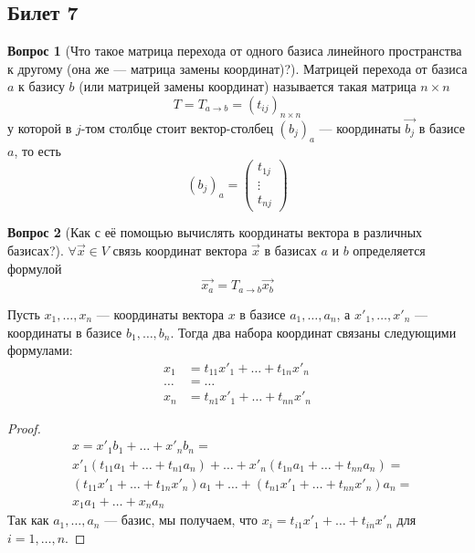\documentclass[a4paper,11pt]{article}
\theoremstyle{remark}
\theoremstyle{definition}
\newtheorem{question}{Вопрос}
\numberwithin{question}{subsection}
\begin{document}
\subsection{Билет 7}
\begin{question}[Что такое матрица перехода от одного базиса линейного пространства к другому (она же --- матрица замены координат)?]
Матрицей перехода от базиса \(a\) к базису \(b\) (или матрицей замены координат) называется такая матрица \(n \times n\)
\begin{equation*}
    T = T_{a \rightarrow b} = (t_{ij})_{n \times n}
\end{equation*}
у которой в \(j\)-том столбце стоит вектор-столбец \((b_j)_a\) --- координаты \(\vec{b_j}\) в базисе \(a\), то есть
\begin{equation*}
    (b_j)_a =
    \begin{pmatrix}
        t_{1j} \\
        \vdots \\
        t_{nj}
    \end{pmatrix} 
\end{equation*}
\end{question}


\begin{question}[Как с её помощью вычислять координаты вектора в различных базисах?]
\(\forall \vec{x} \in V\) связь координат вектора \(\vec{x}\) в базисах \(a\) и \(b\) определяется формулой
\begin{equation*}
     \vec{x_a} = T_{a \rightarrow b}\vec{x_b}
\end{equation*} 

Пусть \(x_1, \dots, x_n\) --- координаты вектора \(x\) в базисе \(a_1, \dots, a_n\), а \(x'_1, \dots, x'_n\) --- координаты в базисе \(b_1, \dots, b_n\). Тогда два набора координат связаны следующими формулами:
\begin{align*}
	x_1 &= t_{11}x'_1 + \dots + t_{1n}x'_n \\
	\dots &= \dots \\
	x_n &= t_{n1}x'_1 + \dots + t_{nn}x'_n
\end{align*}

\begin{proof}
\begin{align*}
	&x = x'_1b_1 + \dots + x'_nb_n = \\ 
	&x'_1(t_{11}a_1 + \dots + t_{n1}a_n) + \dots + x'_n(t_{1n}a_1 + \dots + t_{nn}a_n) = \\ 
	&(t_{11}x'_1 + \dots + t_{1n}x'_n)a_1 + \dots + (t_{n1}x'_1 + \dots + t_{nn}x'_n)a_n = \\
	&x_1a_1 + \dots + x_na_n
\end{align*}
Так как \(a_1, \dots, a_n\) --- базис, мы получаем, что \(x_i = t_{i1}x'_1 + \dots + t_{in}x'_n\) для \(i = 1, \dots, n\).
\end{proof}
\end{question}
\end{document}
